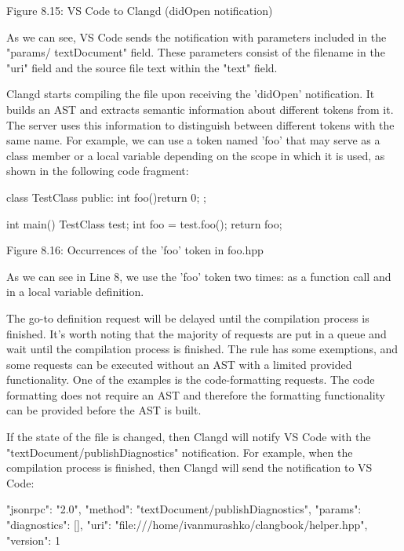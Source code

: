 \begin{center}
Figure 8.15: VS Code to Clangd (didOpen notification)
\end{center}

As we can see, VS Code sends the notification with parameters included in the "params/ textDocument" field. These parameters consist of the filename in the "uri" field and the source file text within the "text" field.

Clangd starts compiling the file upon receiving the ’didOpen’ notification. It builds an AST and extracts semantic information about different tokens from it. The server uses this information to distinguish between different tokens with the same name. For example, we can use a token named ’foo’ that may serve as a class member or a local variable depending on the scope in which it is used, as shown in the following code fragment:

\begin{cpp}
class TestClass {
public:
  int foo(){return 0};
};

int main() {
  TestClass test;
  int foo = test.foo();
  return foo;
}
\end{cpp}

\begin{center}
Figure 8.16: Occurrences of the ’foo’ token in foo.hpp
\end{center}

As we can see in Line 8, we use the ’foo’ token two times: as a function call and in a local variable definition.

The go-to definition request will be delayed until the compilation process is finished. It’s worth noting that the majority of requests are put in a queue and wait until the compilation process is finished. The rule has some exemptions, and some requests can be executed without an AST with a limited provided functionality. One of the examples is the code-formatting requests. The code formatting does not require an AST and therefore the formatting functionality can be provided before the AST is built.

If the state of the file is changed, then Clangd will notify VS Code with the "textDocument/publishDiagnostics" notification. For example, when the compilation process is finished, then Clangd will send the notification to VS Code:

\begin{shell}
{
  "jsonrpc": "2.0",
  "method": "textDocument/publishDiagnostics",
  "params": {
    "diagnostics": [],
    "uri": "file:///home/ivanmurashko/clangbook/helper.hpp",
    "version": 1
  }
}
\end{shell}


